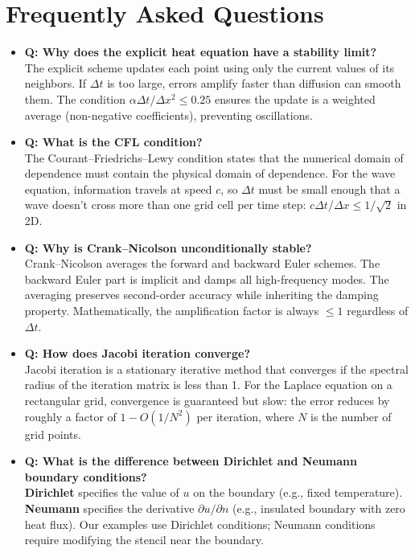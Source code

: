 \section{Frequently Asked Questions}

\begin{itemize}
\item \textbf{Q: Why does the explicit heat equation have a stability limit?} \\
The explicit scheme updates each point using only the current values of its neighbors.
If $\Delta t$ is too large, errors amplify faster than diffusion can smooth them. The condition
$\alpha \Delta t / \Delta x^2 \leq 0.25$ ensures the update is a weighted average (non-negative
coefficients), preventing oscillations.

\item \textbf{Q: What is the CFL condition?} \\
The Courant--Friedrichs--Lewy condition states that the numerical domain of dependence must
contain the physical domain of dependence. For the wave equation, information travels at speed
$c$, so $\Delta t$ must be small enough that a wave doesn't cross more than one grid cell per
time step: $c \Delta t / \Delta x \leq 1/\sqrt{2}$ in 2D.

\item \textbf{Q: Why is Crank--Nicolson unconditionally stable?} \\
Crank--Nicolson averages the forward and backward Euler schemes. The backward Euler part is
implicit and damps all high-frequency modes. The averaging preserves second-order accuracy while
inheriting the damping property. Mathematically, the amplification factor is always $\leq 1$
regardless of $\Delta t$.

\item \textbf{Q: How does Jacobi iteration converge?} \\
Jacobi iteration is a stationary iterative method that converges if the spectral radius of the
iteration matrix is less than 1. For the Laplace equation on a rectangular grid, convergence is
guaranteed but slow: the error reduces by roughly a factor of $1 - O(1/N^2)$ per iteration, where
$N$ is the number of grid points.

\item \textbf{Q: What is the difference between Dirichlet and Neumann boundary conditions?} \\
\textbf{Dirichlet} specifies the value of $u$ on the boundary (e.g., fixed temperature).
\textbf{Neumann} specifies the derivative $\partial u/\partial n$ (e.g., insulated boundary with
zero heat flux). Our examples use Dirichlet conditions; Neumann conditions require modifying the
stencil near the boundary.


\end{itemize}
